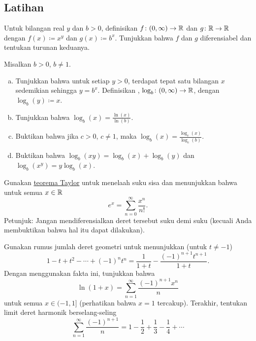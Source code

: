 \subsection{Latihan}

\begin{exercise}
Untuk bilangan real $y$ dan $b > 0$, definisikan $f \colon (0,\infty) \to {\mathbb{R}}$
dan $g \colon {\mathbb{R}} \to {\mathbb{R}}$ dengan $f(x) \coloneqq x^y$ dan $g(x) \coloneqq b^x$.  Tunjukkan bahwa $f$
dan $g$ diferensiabel dan tentukan turunan keduanya.
\end{exercise}

\begin{samepage}
\begin{exercise} \label{exercise:otherlogbases}
Misalkan $b > 0$, $b\neq 1$.
\begin{enumerate}[a)]
\item
Tunjukkan bahwa untuk setiap $y > 0$, terdapat tepat satu bilangan $x$
sedemikian sehingga $y = b^x$.  Definisikan
\emph{},
$\log_b \colon (0,\infty) \to {\mathbb{R}}$, dengan
$\log_b(y) \coloneqq x$.
\item
Tunjukkan bahwa $\log_b(x) = \frac{\ln(x)}{\ln(b)}$.
\item
Buktikan bahwa jika $c > 0$, $c \neq 1$, maka
$\log_b(x) = \frac{\log_c(x)}{\log_c(b)}$.
\item
Buktikan bahwa $\log_b(xy) =
\log_b(x)+\log_b(y)$ dan $\log_b(x^y) = y \log_b(x)$.
\end{enumerate}
\end{exercise}
\end{samepage}

\begin{exercise}
Gunakan \hyperref[thm:taylor]{teorema Taylor} untuk menelaah suku sisa dan menunjukkan bahwa untuk
semua $x \in {\mathbb{R}}$
\begin{equation*}
e^x = \sum_{n=0}^\infty \frac{x^n}{n!} .
\end{equation*}
Petunjuk: Jangan mendiferensialkan deret tersebut suku demi suku (kecuali Anda membuktikan bahwa
hal itu dapat dilakukan).
\end{exercise}

\begin{exercise}
Gunakan rumus jumlah deret geometri untuk menunjukkan (untuk $t \neq -1$)
\begin{equation*}
1-t+t^2-\cdots+{(-1)}^n t^n = \frac{1}{1+t} - \frac{{(-1)}^{n+1}t^{n+1}}{1+t}.
\end{equation*}
Dengan menggunakan fakta ini, tunjukkan bahwa
\begin{equation*}
\ln (1+x) = \sum_{n=1}^\infty \frac{{(-1)}^{n+1}x^n}{n} 
\end{equation*}
untuk semua $x \in (-1,1]$ (perhatikan bahwa $x=1$ tercakup).  Terakhir,
tentukan limit deret harmonik berselang-seling
\begin{equation*}
\sum_{n=1}^\infty \frac{{(-1)}^{n+1}}{n} = 1 - \frac{1}{2} +
\frac{1}{3} - \frac{1}{4} + \cdots
\end{equation*}
\end{exercise}

